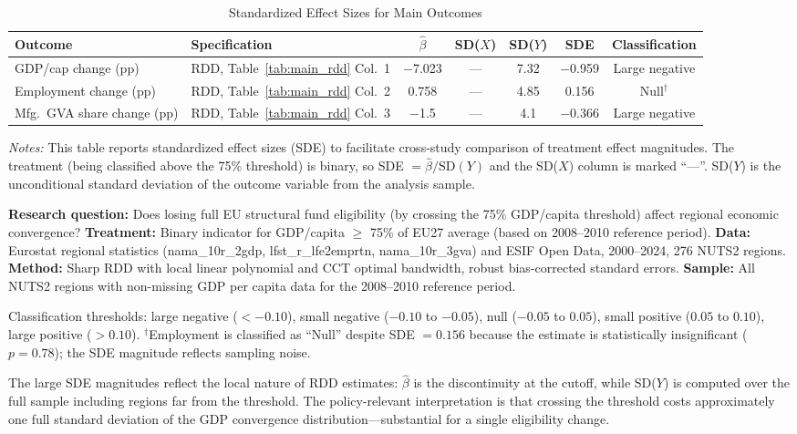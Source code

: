 \documentclass[12pt]{article}
\begin{document}
\begin{table}[H]
\centering
\caption{Standardized Effect Sizes for Main Outcomes}
\label{tab:sde}
\begin{adjustbox}{max width=\textwidth}
\begin{tabular}{llccccc}
\toprule
Outcome & Specification & $\hat{\beta}$ & SD($X$) & SD($Y$) & SDE & Classification \\
\midrule
GDP/cap change (pp) & RDD, Table~\ref{tab:main_rdd} Col.\ 1 & $-$7.023 & --- & 7.32 & $-$0.959 & Large negative \\
Employment change (pp) & RDD, Table~\ref{tab:main_rdd} Col.\ 2 & 0.758 & --- & 4.85 & 0.156 & Null$^\dagger$ \\
Mfg.\ GVA share change (pp) & RDD, Table~\ref{tab:main_rdd} Col.\ 3 & $-$1.5 & --- & 4.1 & $-$0.366 & Large negative \\
\bottomrule
\end{tabular}
\end{adjustbox}
\par\vspace{0.3em}
{\footnotesize \emph{Notes:} This table reports standardized effect sizes (SDE) to facilitate cross-study comparison of treatment effect magnitudes. The treatment (being classified above the 75\% threshold) is binary, so SDE $= \hat{\beta} / \text{SD}(Y)$ and the SD($X$) column is marked ``---''. SD($Y$) is the unconditional standard deviation of the outcome variable from the analysis sample.

\textbf{Research question:} Does losing full EU structural fund eligibility (by crossing the 75\% GDP/capita threshold) affect regional economic convergence?
\textbf{Treatment:} Binary indicator for GDP/capita $\geq$ 75\% of EU27 average (based on 2008--2010 reference period).
\textbf{Data:} Eurostat regional statistics (nama\_10r\_2gdp, lfst\_r\_lfe2emprtn, nama\_10r\_3gva) and ESIF Open Data, 2000--2024, 276 NUTS2 regions.
\textbf{Method:} Sharp RDD with local linear polynomial and CCT optimal bandwidth, robust bias-corrected standard errors.
\textbf{Sample:} All NUTS2 regions with non-missing GDP per capita data for the 2008--2010 reference period.

Classification thresholds: large negative ($< -0.10$), small negative ($-0.10$ to $-0.05$), null ($-0.05$ to $0.05$), small positive ($0.05$ to $0.10$), large positive ($> 0.10$). $^\dagger$Employment is classified as ``Null'' despite SDE $= 0.156$ because the estimate is statistically insignificant ($p = 0.78$); the SDE magnitude reflects sampling noise.}
\end{table}

The large SDE magnitudes reflect the local nature of RDD estimates: $\hat{\beta}$ is the discontinuity at the cutoff, while SD($Y$) is computed over the full sample including regions far from the threshold. The policy-relevant interpretation is that crossing the threshold costs approximately one full standard deviation of the GDP convergence distribution---substantial for a single eligibility change.
\end{document}
